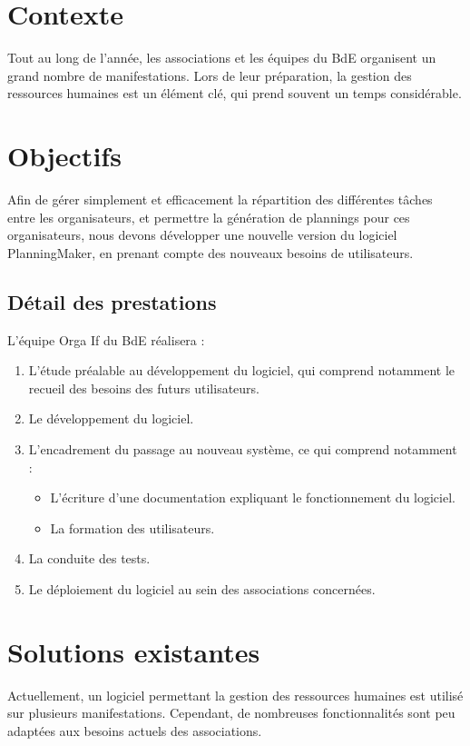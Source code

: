 \section{Contexte}
Tout au long de l'année, les associations et les équipes du BdE organisent un grand nombre de manifestations. Lors de leur préparation, la gestion des ressources humaines est un
 élément clé, qui prend souvent un temps considérable. 


\section{Objectifs}
Afin de gérer simplement et efficacement la répartition des différentes tâches entre les organisateurs, et permettre la génération de plannings pour ces organisateurs, nous devons
développer une nouvelle version du logiciel PlanningMaker, en prenant compte des nouveaux besoins de utilisateurs.

\subsection{Détail des prestations}
L'équipe Orga If du BdE réalisera :
\begin{enumerate}
 \item L'étude préalable au développement du logiciel, qui comprend notamment le recueil des besoins des futurs utilisateurs.
\item Le développement du logiciel.
\item L'encadrement du passage au nouveau système, ce qui comprend notamment : \begin{itemize}
                                                                                \item L'écriture d'une documentation expliquant le fonctionnement du logiciel.
\item La formation des utilisateurs.
                                                                               \end{itemize}
\item La conduite des tests.
\item Le déploiement du logiciel au sein des associations concernées.

\end{enumerate}


\section{Solutions existantes}
Actuellement, un logiciel permettant la gestion des ressources humaines est utilisé sur plusieurs manifestations. Cependant, de nombreuses fonctionnalités sont peu adaptées aux besoins actuels des associations.
